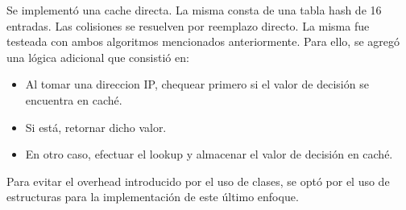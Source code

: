 Se implementó una cache directa. La misma consta de una tabla hash de 16 entradas. Las colisiones se resuelven por reemplazo directo. La misma fue testeada con ambos algoritmos mencionados anteriormente. Para ello, se agregó una lógica adicional que consistió en:

\begin{itemize}
	\item Al tomar una direccion IP, chequear primero si el valor de decisión se encuentra en caché.
	\item Si está, retornar dicho valor.
	\item En otro caso, efectuar el lookup y almacenar el valor de decisión en caché.
\end{itemize}

Para evitar el overhead introducido por el uso de clases, se optó por el uso de estructuras para la implementación de este último enfoque.


